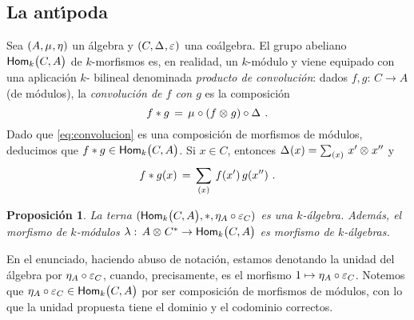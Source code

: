 \theoremstyle{plain}
\newtheorem{defAntipoda}{Definici\'{o}n}[section]
\newtheorem{defHopf}[defAntipoda]{Definici\'{o}n}
\newtheorem{propoProductoDeConvolucion}[defAntipoda]{Proposici\'{o}n}
\newtheorem{teoGrupoDeMorfismos}[defAntipoda]{Teorema}

\theoremstyle{definition}
\newtheorem{obsHopf}[defAntipoda]{Observaci\'{o}n}
\newtheorem{obsAntipoda}[defAntipoda]{Observaci\'{o}n}
\newtheorem{ejemploAlgebraDeGrupo}[defAntipoda]{Ejemplo}
\newtheorem{obsGeneralLinealNoEsCoconmutativa}[defAntipoda]{Observaci\'{o}n}
\newtheorem{obsElementosPrimitivos}[defAntipoda]{Observaci\'{o}n}
\newtheorem{obsElementosDeGrupo}[defAntipoda]{Obervaci\'{o}n}


\subsection{La ant\'{\i}poda}

Sea $(A,\producto,\unidad)$ un \'{a}lgebra y $(C,\coproducto,\counidad)$ una
co\'{a}lgebra. El grupo abeliano $\Hom[k]\big(C,A\big)$ de $k$-morfismos es,
en realidad, un $k$-m\'{o}dulo y viene equipado con una aplicaci\'{o}n $k$-%
bilineal denominada \emph{producto de convoluci\'{o}n}: dados
$f,g:\,C\rightarrow A$ (de m\'{o}dulos), la \emph{convoluci\'{o}n de $f$ con %
$g$} es la composici\'{o}n
\begin{equation}
	\label{eq:convolucion}
	f\convol g \,=\,\producto\circ(f\tensor g)\circ\coproducto
	\text{ .}
\end{equation}
%
Dado que \eqref{eq:convolucion} es una composici\'{o}n de morfismos de
m\'{o}dulos, deducimos que $f\convol g\in\Hom[k]\big(C,A\big)$. Si $x\in C$,
entonces $\coproducto(x)=\sum_{(x)}\,x'\tensor x''$ y
\begin{equation}
	\label{eq:convolucionexplicita}
	f\convol g(x) \,=\,\sum_{(x)}\,f(x')\,g(x'')
	\text{ .}
\end{equation}
%

\begin{propoProductoDeConvolucion}\label{propo:productodeconvolucion}
	La terna $(\Hom[k]\big(C,A\big),\convol,\unidad[A]\circ\counidad[C])$
	es una $k$-\'{a}lgebra. Adem\'{a}s, el morfismo de $k$-m\'{o}dulos
	$\lambda:\,A\tensor\dual C\rightarrow\Hom[k]\big(C,A\big)$ es morfismo
	de $k$-\'{a}lgebras.
\end{propoProductoDeConvolucion}

En el enunciado, haciendo abuso de notaci\'{o}n, estamos denotando la unidad
del \'{a}lgebra por $\unidad[A]\circ\counidad[C]$, cuando, precisamente, es el
morfismo $1\mapsto\unidad[A]\circ\counidad[C]$. Notemos que
$\unidad[A]\circ\counidad[C]\in\Hom[k]\big(C,A\big)$ por ser composici\'{o}n de
morfismos de m\'{o}dulos, con lo que la unidad propuesta tiene el dominio y el
codominio correctos.

